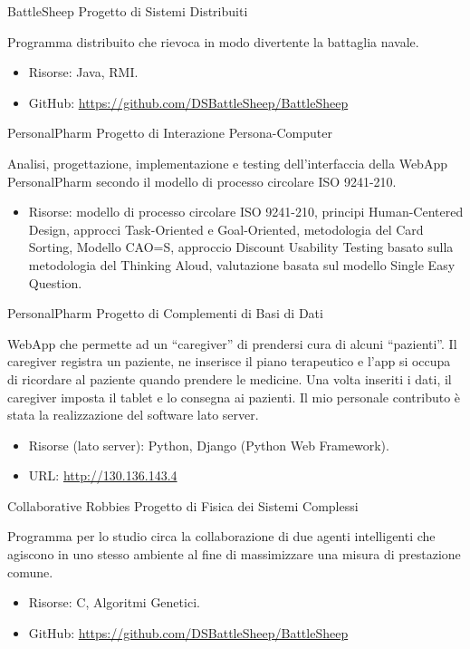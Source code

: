 {BattleSheep}
{Progetto di Sistemi Distribuiti}
{}
{}
{Programma distribuito che rievoca in modo divertente la battaglia navale.
\begin{itemize}
	\item Risorse: Java, RMI.
	\item GitHub: \url{https://github.com/DSBattleSheep/BattleSheep}
\end{itemize}}

{PersonalPharm}
{Progetto di Interazione Persona-Computer}
{}
{}
{Analisi, progettazione, implementazione e testing dell'interfaccia della WebApp
PersonalPharm secondo il modello di processo circolare ISO 9241-210.
\begin{itemize}
	\item Risorse: modello di processo circolare ISO 9241-210, principi
	Human-Centered Design, approcci Task-Oriented e Goal-Oriented, metodologia
	del Card Sorting, Modello CAO=S, approccio Discount Usability Testing basato
	sulla metodologia del Thinking Aloud, valutazione basata sul modello Single
	Easy Question.
\end{itemize}}

{PersonalPharm}
{Progetto di Complementi di Basi di Dati}
{}
{}
{WebApp che permette ad un ``caregiver'' di prendersi cura di alcuni
``pazienti''.\newline
Il caregiver registra un paziente, ne inserisce il piano terapeutico e l'app si
occupa di ricordare al paziente quando prendere le medicine. Una volta inseriti
i dati, il caregiver imposta il tablet e lo consegna ai pazienti.\newline
Il mio personale contributo è stata la realizzazione del software lato server.
\begin{itemize}
	\item Risorse (lato server): Python, Django (Python Web Framework).
	\item URL: \url{http://130.136.143.4}
\end{itemize}}

{Collaborative Robbies}
{Progetto di Fisica dei Sistemi Complessi}
{}
{}
{Programma per lo studio circa la collaborazione di due agenti intelligenti che
agiscono in uno stesso ambiente al fine di massimizzare una misura di
prestazione comune.
\begin{itemize}
	\item Risorse: C, Algoritmi Genetici.
	\item GitHub: \url{https://github.com/DSBattleSheep/BattleSheep}
\end{itemize}}
